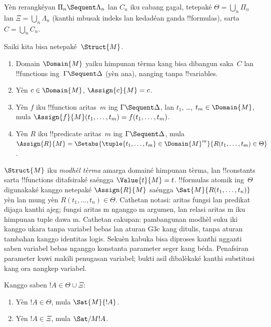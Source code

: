 \documentclass[../../../include/open-logic-section]{subfiles}
\begin{document}
Yèn rerangkéyan $\Pi_n \Sequent \Lambda_n$ lan $C_n$
iku cabang gagal, tetepaké $\Theta = \bigcup_n \Pi_n$
lan $\Xi = \bigcup_n \Lambda_n$ (kanthi mbusak indeks lan
kedadéan ganda !!{formula}s), sarta $C = \bigcup_n C_n$.

Saiki kita bisa netepaké~$\Struct{M}$.
\begin{enumerate}
\item Domain $\Domain{M}$ yaiku himpunan tèrma kang bisa
dibangun saka~$C$ lan !!{function}s ing~$\Gamma \Sequent \Delta$
(yèn ana), nanging tanpa !!{variable}s.
\item Yèn $c \in \Domain{M}$, $\Assign{c}{M} = c$.
\item Yèn $f$ iku !!{function} aritas~$m$ ing
$\Gamma \Sequent \Delta$, lan $t_1$, \dots,
$t_m \in \Domain{M}$, mula
$\Assign{f}{M}(t_1, \dots, t_m) = f(t_1, \dots, t_m)$.
\item Yèn $R$ iku !!{predicate} aritas~$m$ ing
$\Gamma \Sequent \Delta$, mula
$\Assign{R}{M} = \Setabs{\tuple{t_1, \dots, t_m} \in
\Domain{M}^m}{R(t_1, \dots, t_m) \in \Theta}$.
\end{enumerate}
$\Struct{M}$ iku \emph{modhèl tèrma} amarga domainé
himpunan tèrma, lan !!{constant}s sarta !!{function}s
ditafsiraké saéngga $\Value{t}{M} = t$. !!{formula}s
atomik ing~$\Theta$ digunakaké kanggo netepaké
$\Assign{R}{M}$ saéngga $\Sat{M}{R(t_1, \dots, t_n)}$
yèn lan mung yèn $R(t_1, \dots, t_n) \in \Theta$.
Cathetan notasi: aritas fungsi lan predikat dijaga kanthi ajeg; fungsi aritas m nganggo m argumen, lan relasi aritas m iku himpunan tuple dawa m.
Cathetan cakupan: pambangunan modhèl suku iki kanggo ukara tanpa variabel bebas lan aturan G3c kang ditulis, tanpa aturan tambahan kanggo identitas logis. Sekuèn kabuka bisa diproses kanthi ngganti saben variabel bebas nganggo konstanta parameter seger kang béda. Penafsiran parameter kuwi makili penugasan variabel; bukti asil dibalèkaké kanthi substitusi kang ora nangkep variabel.

\begin{lem}
Kanggo saben $!A \in \Theta \cup \Xi$:
\begin{enumerate}
  \item Yèn $!A \in \Theta$, mula $\Sat{M}{!A}$.
  \item Yèn $!A \in \Xi$, mula $\Sat/{M}{!A}$.
\end{enumerate}
\end{lem}
\end{document}
